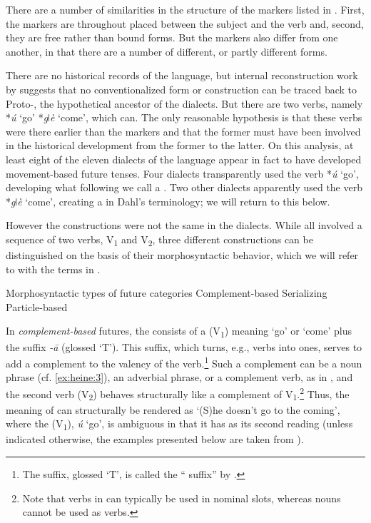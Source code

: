 \documentclass[output=paper]{langsci/langscibook}
\begin{document}
There are a number of similarities in the structure of the  markers listed in . First, the markers are throughout placed between the subject and the verb and, second, they are free rather than bound forms. But the markers also differ from one another, in that there are a number of different, or partly different forms. 


  There are no historical records of the language, but internal reconstruction work by \citet{HeineKönigForthc} suggests that no conventionalized  form or construction can be traced back to Proto-, the hypothetical ancestor of the dialects. But there are two verbs, namely *{\textit{ú}} ‘go’ *{\textit{g}}{ǀ}{\textit{è}} ‘come’, which can. The only reasonable hypothesis is that these verbs were there earlier than the  markers and that the former must have been involved in the historical development from the former to the latter. On this analysis, at least eight of the eleven dialects of the language appear in fact to have developed movement-based future tenses. Four dialects transparently used the verb *{\textit{ú}} ‘go’, developing what following \citet{Dahl2000} we call a .  Two other dialects apparently used the verb *{\textit{g}}ǀ{\textit{è}} ‘come’, creating a  in Dahl’s terminology; we will return to this below. 



However the constructions were not the same in the dialects. While all involved a sequence of two verbs, V\textsubscript{1} and V\textsubscript{2}, three different constructions can be distinguished on the basis of their morphosyntactic behavior, which we will refer to with the terms in . 



\ea%
    \label{ex:heine:1} 
         Morphosyntactic types of future categories
\ea  Complement-based
\ex  Serializing
\ex  Particle-based
\z
\z



In \textit{complement-based} futures, the  consists of a  (V\textsubscript{1}) meaning ‘go’ or ‘come’ plus the  suffix \textit{-ā} (glossed ‘T’). This suffix, which turns, e.g.,  verbs into  ones, serves to add a complement to the valency of the verb.\footnote{The suffix, glossed ‘T’, is called the `` suffix'' by \citet[37--38]{Dickens2005}.} Such a complement can be a noun phrase (cf. \ref{ex:heine:3}), an adverbial phrase, or a complement verb, as in , and the second verb (V\textsubscript{2}) behaves structurally like a complement of V\textsubscript{1}.\footnote{Note that verbs in  can typically be used in nominal slots, whereas nouns cannot be used as verbs.} Thus, the meaning of  can structurally be rendered as ‘(S)he doesn't go to the coming’, where the  (V\textsubscript{1}), \textit{ú} ‘go’, is ambiguous in that it has  as its second reading (unless indicated otherwise, the examples presented below are taken from \citealt{HeineKönigForthc}).    
\end{document}
